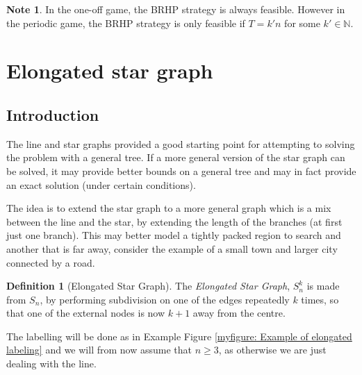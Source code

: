 \documentclass[a4paper,10pt]{article}
\theoremstyle{definition}
\newtheorem{definition}[theorem]{Definition}
\theoremstyle{definition}
\theoremstyle{remark}
\theoremstyle{definition}
\newtheorem*{note}{Note}
\begin{document}
\begin{note}
In the one-off game, the BRHP strategy is always feasible. However in the periodic game, the BRHP strategy is only feasible if $T=k'n$ for some $k' \in \mathbb{N}$.
\end{note}

\section{Elongated star graph}
\subsection{Introduction}

The line and star graphs provided a good starting point for attempting to solving the problem with a general tree. If a more general version of the star graph can be solved, it may provide better bounds on a general tree and may in fact provide an exact solution (under certain conditions). 

The idea is to extend the star graph to a more general graph which is a mix between the line and the star, by extending the length of the branches (at first just one branch). This may better model a tightly packed region to search and another that is far away, consider the example of a small town and larger city connected by a road. 

\begin{definition}[Elongated Star Graph]
The \textit{Elongated Star Graph}, $S_{n}^k$ is made from $S_{n}$, by performing subdivision on one of the edges repeatedly $k$ times, so that one of the external nodes is now $k+1$ away from the centre.
\end{definition}

The labelling will be done as in Example Figure \ref{myfigure: Example of elongated labeling} and we will from now assume that $n \geq 3$, as otherwise we are just dealing with the line.


\begin{myfigure}
\begin{center}
\end{center}
\caption{Labeling on the graph $S_{4}^5$.}
\label{myfigure: Example of elongated labeling}
\end{myfigure}
\end{document}
